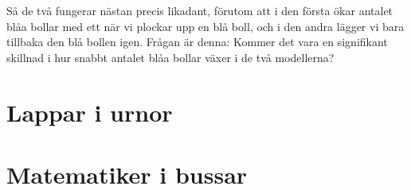 \documentclass[nobib]{tufte-handout}
\begin{document}
\begin{xca}
\begin{enumerate}
        Så de två fungerar nästan precis likadant, förutom att i den första ökar antalet blåa bollar med ett när vi plockar upp en blå boll, och i den andra lägger vi bara tillbaka den blå bollen igen. Frågan är denna: Kommer det vara en signifikant skillnad i hur snabbt antalet blåa bollar växer i de två modellerna?
    \end{enumerate}
\end{xca}

\section{Lappar i urnor}

\section{Matematiker i bussar}


%
%
\end{document}
